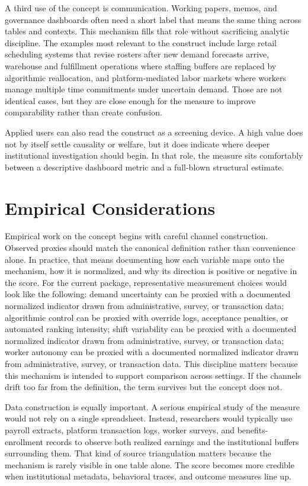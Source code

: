 \documentclass[12pt]{article}
\begin{document}
A third use of the concept is communication. Working papers, memos, and governance dashboards often need a short label that means the same thing across tables and contexts. This mechanism fills that role without sacrificing analytic discipline. The examples most relevant to the construct include large retail scheduling systems that revise rosters after new demand forecasts arrive, warehouse and fulfillment operations where staffing buffers are replaced by algorithmic reallocation, and platform-mediated labor markets where workers manage multiple time commitments under uncertain demand. Those are not identical cases, but they are close enough for the measure to improve comparability rather than create confusion.

Applied users can also read the construct as a screening device. A high value does not by itself settle causality or welfare, but it does indicate where deeper institutional investigation should begin. In that role, the measure sits comfortably between a descriptive dashboard metric and a full-blown structural estimate.

\section{Empirical Considerations}
Empirical work on the concept begins with careful channel construction. Observed proxies should match the canonical definition rather than convenience alone. In practice, that means documenting how each variable maps onto the mechanism, how it is normalized, and why its direction is positive or negative in the score. For the current package, representative measurement choices would look like the following: demand uncertainty can be proxied with a documented normalized indicator drawn from administrative, survey, or transaction data; algorithmic control can be proxied with override logs, acceptance penalties, or automated ranking intensity; shift variability can be proxied with a documented normalized indicator drawn from administrative, survey, or transaction data; worker autonomy can be proxied with a documented normalized indicator drawn from administrative, survey, or transaction data. This discipline matters because this mechanism is intended to support comparison across settings. If the channels drift too far from the definition, the term survives but the concept does not.

Data construction is equally important. A serious empirical study of the measure would not rely on a single spreadsheet. Instead, researchers would typically use payroll extracts, platform transaction logs, worker surveys, and benefits-enrollment records to observe both realized earnings and the institutional buffers surrounding them. That kind of source triangulation matters because the mechanism is rarely visible in one table alone. The score becomes more credible when institutional metadata, behavioral traces, and outcome measures line up.
\end{document}

